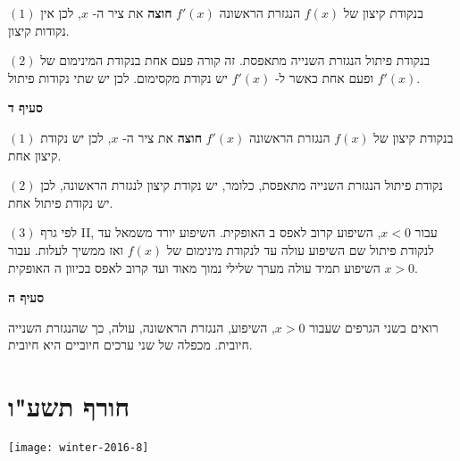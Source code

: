 $(1)$
בנקודת קיצון של
$f(x)$
הנגזרת הראשונה 
$f'(x)$
\textbf{חוצה}
את ציר ה-%
$x$,
לכן אין נקודות קיצון.

$(2)$
בנקודת פיתול הנגזרת השנייה מתאפסת. זה קורה פעם אחת בנקודת המינימום של
$f'(x)$
ופעם אחת כאשר ל-%
$f'(x)$
יש נקודת מקסימום. לכן יש שתי נקודות פיתול.

\textbf{סעיף ד}

$(1)$
בנקודת קיצון של
$f(x)$
הנגזרת הראשונה 
$f'(x)$
\textbf{חוצה}
את ציר ה-%
$x$,
לכן יש נקודת קיצון אחת.

$(2)$
נקודת פיתול הנגזרת השנייה מתאפסת, כלומר, יש נקודת קיצון לנגזרת הראשונה, לכן יש נקודת פיתול אחת.


$(3)$
לפי גרף II, עבור
$x<0$,
השיפוע קרוב לאפס ב%
\asm{}
האופקית. השיפוע יורד משמאל עד לנקודת פיתול שם השיפוע עולה עד לנקודת מינימום של
$f(x)$
ואז ממשיך לעלות. עבור
$x>0$
השיפוע תמיד עולה מערך שלילי נמוך מאוד ועד קרוב לאפס בכיוון ה%
\asm{}
האופקית.

\begin{center}
\end{center}


\textbf{סעיף ה}

רואים בשני הגרפים שעבור
$x>0$,
השיפוע, הנגזרת הראשונה, עולה, כך שהנגזרת השנייה חיובית. מכפלה של שני ערכים חיוביים היא חיובית.


\np



\section{חורף תשע"ו}

\begin{center}
\texttt{[image: winter-2016-8]}

\end{center}

